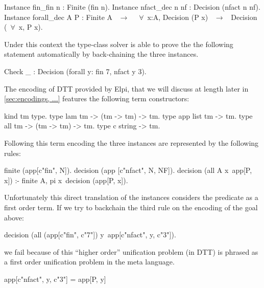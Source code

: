 \documentclass[sigconf,natbib=false]{acmart}
\begin{document}
\begin{coqcode}
Instance fin_fin n : Finite (fin n).
Instance nfact_dec n nf : Decision (nfact n nf).
Instance forall_dec A P : Finite A ~$\to$~ 
  ~$\forall$~x:A, Decision (P x) ~$\to$~ Decision (~$\forall$~x, P x).
\end{coqcode}

\noindent Under this context the type-class solver is able to prove
the the following statement automatically by back-chaining
the three instances.

\begin{coqcode}
  Check _ : Decision (forall y: fin 7, nfact y 3).
\end{coqcode}

\noindent
The encoding of DTT provided by Elpi, that we will discuss at length later in
\cref{sec:encodings, ...} features the following term constructors:

\begin{elpicode}
kind tm type.
type lam tm -> (tm -> tm) -> tm. %
type app list tm -> tm.          %
type all tm -> (tm -> tm) -> tm. %
type c string -> tm.             %
\end{elpicode}

\noindent
{}
Following this term encoding the three instances are represented by the
following rules:

\begin{elpicode}
finite (app[c"fin", N]).
decision (app [c"nfact", N, NF]).
decision (all A x\ app[P, x]) :- finite A,
  pi x\ decision (app[P, x]).
\end{elpicode}

\noindent
{}
Unfortunately this direct translation of the instances considers the
predicate  as a first order term. If we try to backchain the
third rule on the encoding of the goal above:
  
\begin{elpicode}
decision (all (app[c"fin", c"7"]) y\
  app[c"nfact", y, c"3"]).
\end{elpicode}

\noindent
we fail because of this ``higher order'' unification problem (in DTT)
is phrased as a first order unification problem in the meta language.

\begin{elpicode}
app[c"nfact", y, c"3"] = app[P, y]
\end{elpicode}
\end{document}
